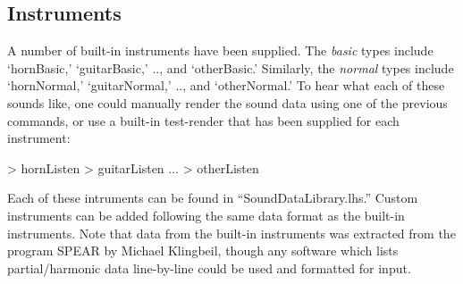 \documentclass[11pt]{article}
\begin{document}
\subsection{Instruments}
A number of built-in instruments have been supplied. The \emph{basic} types include `hornBasic,' `guitarBasic,' .., and `otherBasic.' Similarly, the \emph{normal} types include `hornNormal,' `guitarNormal,' .., and `otherNormal.' 
To hear what each of these sounds like, one could manually render the sound data using one of the previous commands, or use a built-in test-render that has been supplied for each instrument:
\begin{code}
> hornListen
> guitarListen
...
> otherListen
\end{code}
Each of these intruments can be found in ``SoundDataLibrary.lhs.'' Custom instruments can be added following the same data format as the built-in instruments. Note that data from the built-in instruments was extracted from the program SPEAR by Michael Klingbeil\cite{klingbeil}, though any software which lists partial/harmonic data line-by-line could be used and formatted for input.
\end{document}
